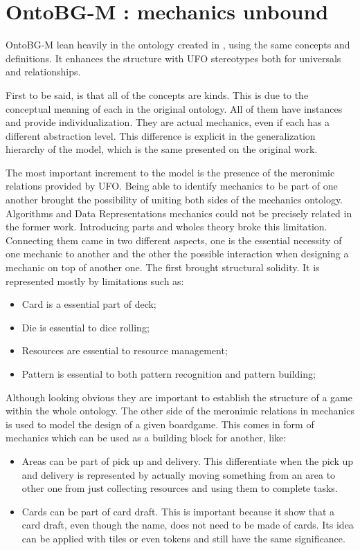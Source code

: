 \section{OntoBG-M : mechanics unbound}

OntoBG-M lean heavily in the ontology created in \cite{kritz_buildingOntology}, using the same concepts and definitions. It enhances the structure with UFO stereotypes both for universals and relationships.

First to be said, is that all of the concepts are kinds. This is due to the conceptual meaning of each in the original ontology. All of them have instances and provide individualization. They are actual mechanics, even if each has a different abstraction level. This difference is explicit in the generalization hierarchy of the model, which is the same presented on the original work.

The most important increment to the model is the presence of the meronimic relations provided by UFO. Being able to identify mechanics to be part of one another brought the possibility of uniting both sides of the mechanics ontology. Algorithms and Data Representations mechanics could not be precisely related in the former work. Introducing parts and wholes theory broke this limitation. Connecting them came in two different aspects, one is the essential necessity of one mechanic to another and the other the possible interaction when designing a mechanic on top of another one. The first brought structural solidity. It is represented mostly by limitations such as:

\begin{itemize}
    \item Card is a essential part of deck;
    \item Die is essential to dice rolling;
    \item Resources are essential to resource management;
    \item Pattern is essential to both pattern recognition and pattern building;
\end{itemize}

Although looking obvious they are important to establish the structure of a game within the whole ontology. The other side of the meronimic relations in mechanics is used to model the design of a given boardgame. This comes in form of mechanics which can be used as a building block for another, like:
\begin{itemize}
    \item Areas can be part of pick up and delivery. This differentiate when the pick up and delivery is represented by actually moving something from an area to other one from just collecting resources and using them to complete tasks.
    \item Cards can be part of card draft. This is important because it show that a card draft, even though the name, does not need to be made of cards. Its idea can be applied with tiles or even tokens and still have the same significance.
\end{itemize} 

